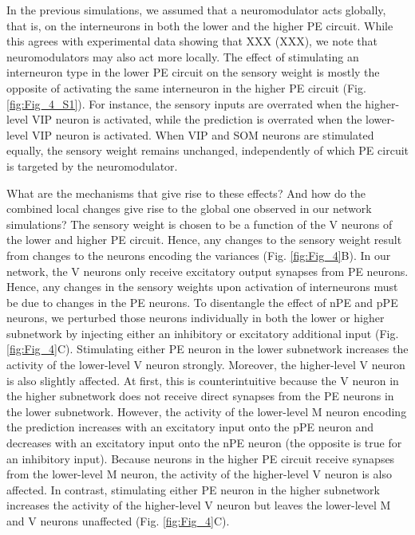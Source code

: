 \documentclass[10pt,a4paper]{article}
\begin{document}
In the previous simulations, we assumed that a neuromodulator acts globally, that is, on the interneurons in both the lower and the higher PE circuit. While this agrees with experimental data showing that XXX (XXX), we note that neuromodulators may also act more locally. The effect of stimulating an interneuron type in the lower PE circuit on the sensory weight is mostly the opposite of activating the same interneuron in the higher PE circuit (Fig. \ref{fig:Fig_4_S1}). For instance, the sensory inputs are overrated when the higher-level VIP neuron is activated, while the prediction is overrated when the lower-level VIP neuron is activated. When VIP and SOM neurons are stimulated equally, the sensory weight remains unchanged, independently of which PE circuit is targeted by the neuromodulator. 

What are the mechanisms that give rise to these effects? And how do the combined local changes give rise to the global one observed in our network simulations? The sensory weight is chosen to be a function of the V neurons of the lower and higher PE circuit. Hence, any changes to the sensory weight result from changes to the neurons encoding the variances (Fig. \ref{fig:Fig_4}B). In our network, the V neurons only receive excitatory output synapses from PE neurons. Hence, any changes in the sensory weights upon activation of interneurons must be due to changes in the PE neurons. To disentangle the effect of nPE and pPE neurons, we perturbed those neurons individually in both the lower or higher subnetwork by injecting either an inhibitory or excitatory additional input (Fig. \ref{fig:Fig_4}C). Stimulating either PE neuron in the lower subnetwork increases the activity of the lower-level V neuron strongly. Moreover, the higher-level V neuron is also slightly affected. At first, this is counterintuitive because the V neuron in the higher subnetwork does not receive direct synapses from the PE neurons in the lower subnetwork. However, the activity of the lower-level M neuron encoding the prediction increases with an excitatory input onto the pPE neuron and decreases with an excitatory input onto the nPE neuron (the opposite is true for an inhibitory input). Because neurons in the higher PE circuit receive synapses from the lower-level M neuron, the activity of the higher-level V neuron is also affected. In contrast, stimulating either PE neuron in the higher subnetwork increases the activity of the higher-level V neuron but leaves the lower-level M and V neurons unaffected (Fig. \ref{fig:Fig_4}C).
\end{document}

